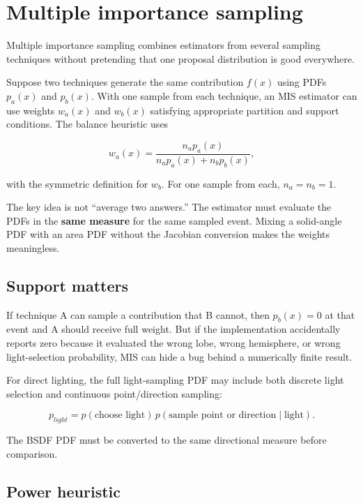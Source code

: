 \hypertarget{appendix-ca8898faf1a6}{}\label{referencestart:appendix-ca8898faf1a6}
\section{Multiple importance sampling}\label{appendix-ca8898faf1a6-multiple-importance-sampling}

Multiple importance sampling combines estimators from several sampling techniques without pretending that one proposal distribution is good everywhere.

Suppose two techniques generate the same contribution \(f(x)\) using PDFs \(p_a(x)\) and \(p_b(x)\). With one sample from each technique, an MIS estimator can use weights \(w_a(x)\) and \(w_b(x)\) satisfying appropriate partition and support conditions. The balance heuristic uses

\[
w_a(x)=\frac{n_a p_a(x)}{n_a p_a(x)+n_b p_b(x)},
\]

with the symmetric definition for \(w_b\). For one sample from each, \(n_a=n_b=1\).

The key idea is not ``average two answers.'' The estimator must evaluate the PDFs in the \textbf{same measure} for the same sampled event. Mixing a solid-angle PDF with an area PDF without the Jacobian conversion makes the weights meaningless.

\subsection{Support matters}\label{appendix-ca8898faf1a6-support-matters}

If technique A can sample a contribution that B cannot, then \(p_b(x)=0\) at that event and A should receive full weight. But if the implementation accidentally reports zero because it evaluated the wrong lobe, wrong hemisphere, or wrong light-selection probability, MIS can hide a bug behind a numerically finite result.

For direct lighting, the full light-sampling PDF may include both discrete light selection and continuous point/direction sampling:

\[
p_{light}=p(\text{choose light})\,p(\text{sample point or direction}\mid\text{light}).
\]

The BSDF PDF must be converted to the same directional measure before comparison.

\subsection{Power heuristic}\label{appendix-ca8898faf1a6-power-heuristic}

